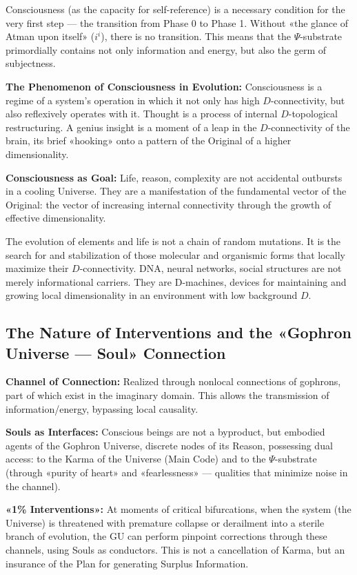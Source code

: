\documentclass[a4paper,12pt]{article}
\begin{document}
	Consciousness (as the capacity for self-reference) is a necessary condition for the very first step — the transition from Phase 0 to Phase 1. Without «the glance of Atman upon itself» ($i^i$), there is no transition. This means that the $\Psi$-substrate primordially contains not only information and energy, but also the germ of subjectness.
	
	\textbf{The Phenomenon of Consciousness in Evolution:} Consciousness is a regime of a system's operation in which it not only has high $D$-connectivity, but also reflexively operates with it. Thought is a process of internal $D$-topological restructuring. A genius insight is a moment of a leap in the $D$-connectivity of the brain, its brief «hooking» onto a pattern of the Original of a higher dimensionality.
	
	\textbf{Consciousness as Goal:} Life, reason, complexity are not accidental outbursts in a cooling Universe. They are a manifestation of the fundamental vector of the Original: the vector of increasing internal connectivity through the growth of effective dimensionality.
	
	The evolution of elements and life is not a chain of random mutations. It is the search for and stabilization of those molecular and organismic forms that locally maximize their $D$-connectivity. DNA, neural networks, social structures are not merely informational carriers. They are D-machines, devices for maintaining and growing local dimensionality in an environment with low background $D$.
	
	\subsection{The Nature of Interventions and the «Gophron Universe — Soul» Connection}
	
	\textbf{Channel of Connection:} Realized through nonlocal connections of gophrons, part of which exist in the imaginary domain. This allows the transmission of information/energy, bypassing local causality.
	
	\textbf{Souls as Interfaces:} Conscious beings are not a byproduct, but embodied agents of the Gophron Universe, discrete nodes of its Reason, possessing dual access: to the Karma of the Universe (Main Code) and to the $\Psi$-substrate (through «purity of heart» and «fearlessness» — qualities that minimize noise in the channel).
	
	\textbf{«1\% Interventions»:} At moments of critical bifurcations, when the system (the Universe) is threatened with premature collapse or derailment into a sterile branch of evolution, the GU can perform pinpoint corrections through these channels, using Souls as conductors. This is not a cancellation of Karma, but an insurance of the Plan for generating Surplus Information.
	
\end{document}
